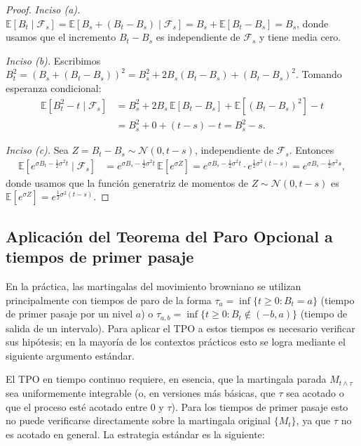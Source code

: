 \documentclass[12pt]{book}
\begin{document}
\begin{proof}
\textit{Inciso (a).} $\mathbb{E}[B_t \mid \mathcal{F}_s] = \mathbb{E}[B_s + (B_t - B_s) \mid \mathcal{F}_s] = B_s + \mathbb{E}[B_t - B_s] = B_s$, donde usamos que el incremento $B_t - B_s$ es independiente de $\mathcal{F}_s$ y tiene media cero.

\textit{Inciso (b).} Escribimos $B_t^2 = (B_s + (B_t - B_s))^2 = B_s^2 + 2B_s(B_t - B_s) + (B_t - B_s)^2$. Tomando esperanza condicional:
\begin{align*}
    \mathbb{E}[B_t^2 - t \mid \mathcal{F}_s]
    &= B_s^2 + 2B_s\,\mathbb{E}[B_t - B_s] + \mathbb{E}[(B_t-B_s)^2] - t \\
    &= B_s^2 + 0 + (t-s) - t = B_s^2 - s.
\end{align*}

\textit{Inciso (c).} Sea $Z = B_t - B_s \sim \mathcal{N}(0, t-s)$, independiente de $\mathcal{F}_s$. Entonces
\begin{align*}
    \mathbb{E}\!\left[e^{\sigma B_t - \frac{1}{2}\sigma^2 t} \mid \mathcal{F}_s\right]
    &= e^{\sigma B_s - \frac{1}{2}\sigma^2 t}\,\mathbb{E}\!\left[e^{\sigma Z}\right]
    = e^{\sigma B_s - \frac{1}{2}\sigma^2 t} \cdot e^{\frac{1}{2}\sigma^2(t-s)}
    = e^{\sigma B_s - \frac{1}{2}\sigma^2 s},
\end{align*}
donde usamos que la función generatriz de momentos de $Z \sim \mathcal{N}(0, t-s)$ es $\mathbb{E}[e^{\sigma Z}] = e^{\frac{1}{2}\sigma^2(t-s)}$.
\end{proof}

\subsection{Aplicación del Teorema del Paro Opcional a tiempos de primer pasaje}

En la práctica, las martingalas del movimiento browniano se utilizan principalmente con tiempos de paro de la forma $\tau_a = \inf\{t \ge 0 : B_t = a\}$ (tiempo de primer pasaje por un nivel $a$) o $\tau_{a,b} = \inf\{t \ge 0 : B_t \notin (-b, a)\}$ (tiempo de salida de un intervalo). Para aplicar el TPO a estos tiempos es necesario verificar sus hipótesis; en la mayoría de los contextos prácticos esto se logra mediante el siguiente argumento estándar.

El TPO en tiempo continuo requiere, en esencia, que la martingala parada $M_{t \wedge \tau}$ sea uniformemente integrable (o, en versiones más básicas, que $\tau$ sea acotado o que el proceso esté acotado entre $0$ y $\tau$). Para los tiempos de primer pasaje esto no puede verificarse directamente sobre la martingala original $\{M_t\}$, ya que $\tau$ no es acotado en general. La estrategia estándar es la siguiente:
\end{document}
